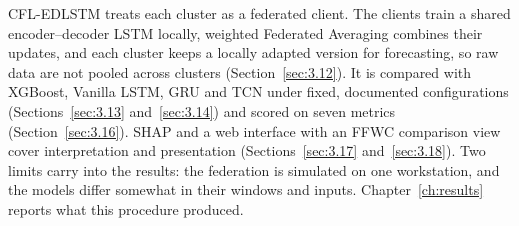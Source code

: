 CFL-EDLSTM treats each cluster as a federated client. The clients train a shared
encoder--decoder LSTM locally, weighted Federated Averaging combines their
updates, and each cluster keeps a locally adapted version for forecasting, so
raw data are not pooled across clusters (Section~\ref{sec:3.12}). It is compared
with XGBoost, Vanilla LSTM, GRU and TCN under fixed, documented configurations
(Sections~\ref{sec:3.13} and~\ref{sec:3.14}) and scored on seven metrics
(Section~\ref{sec:3.16}). SHAP and a web interface with an FFWC comparison view
cover interpretation and presentation (Sections~\ref{sec:3.17}
and~\ref{sec:3.18}). Two limits carry into the results: the federation is
simulated on one workstation, and the models differ somewhat in their windows
and inputs. Chapter~\ref{ch:results} reports what this procedure produced.